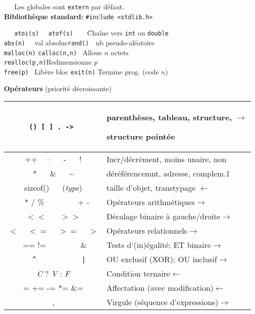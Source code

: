 \documentclass[a4paper,10pt,landscape]{article}
\newcommand{\Subsection}[1]{{\textbf{#1}}}
\begin{document}
\begin{minipage}{1.0\linewidth}
\begin{multicols}{3}
  ~~~Les globales sont \verb=extern= par défaut.\\[-.5\baselineskip]

  \textbf{Bibliothèque standard:} \verb=#include <stdlib.h>= \vspace{-.6\baselineskip}
  \begin{tabbing}
    ~~~\=\verb=atoi(s)  = \=\verb=atof(s)    =\=Chaîne vers \verb=int= ou \verb=double=\\
    \>\verb=abs(n)  = val absolue\>\>\verb=rand()  =nb pseudo-aléatoire\\
    \>\verb=malloc(n)= \>\verb=calloc(n,n)= \>~Alloue $n$ octets\\
    \>\verb=realloc(p,n)=\>\>Redimensionne $p$\\
    \>\verb=free(p) = Libère bloc 
    \>\>\verb=exit(n)= Termine prog. (code $n$)
  \end{tabbing}
  \columnbreak %

  \Subsection{Opérateurs} (priorité décroissante)
  
  \begin{tabular}{|c|c| p{53.5mm}|}\hline
    \multicolumn{2}{|c|}{\tt ()  [ ]  .  -> }
    & parenthèses, tableau, structure, \hfill$\rightarrow$\par
      structure pointée\\\hline
    \multicolumn{2}{|c|}{++ ~ -- ~~  - ~~ !}&Incr/décrément, moins unaire, non\\
    \multicolumn{2}{|c|}{* ~~ \& ~~ \~}&déréférencemnt, adresse,
                                         complem.1$\!\!$\\
    \multicolumn{2}{|c|}{sizeof() ~~  (\textit{type})}&
     taille d'objet, transtypage \hfill$\leftarrow$\\\hline
    * / \% & + - & Opérateurs arithmétiques\hfill$\rightarrow$ \\\hline
    \multicolumn{2}{|c|}{$<<$ ~~ $>>$} &Décalage binaire à gauche/droite\hfill$\rightarrow$\\\hline
    \multicolumn{2}{|c|}{$<$ ~ $<=$ ~ $>=$ ~ $>$} &Opérateurs relationnels\hfill$\rightarrow$\\\hline
    ==  != &  \& & Tests d'(in)égalité; ET binaire\hfill$\rightarrow$\\\hline
    \verb=^= & \verb=|= & OU exclusif (XOR); OU inclusif\hfill$\rightarrow$\\\hline
    \multicolumn{2}{|c|}{\textit{C} ? \textit{V} : \textit{F}}&
        Condition ternaire\hfill$\leftarrow$\\\hline
    \multicolumn{2}{|c|}{=  += -= *= \&= }&
        Affectation (avec modification)\hfill$\leftarrow$\\\hline
    \multicolumn{2}{|c|}{,}& Virgule (séquence d'expressions)\hfill$\rightarrow$\\\hline
  \end{tabular}


\end{multicols}
\end{minipage}
\end{document}
